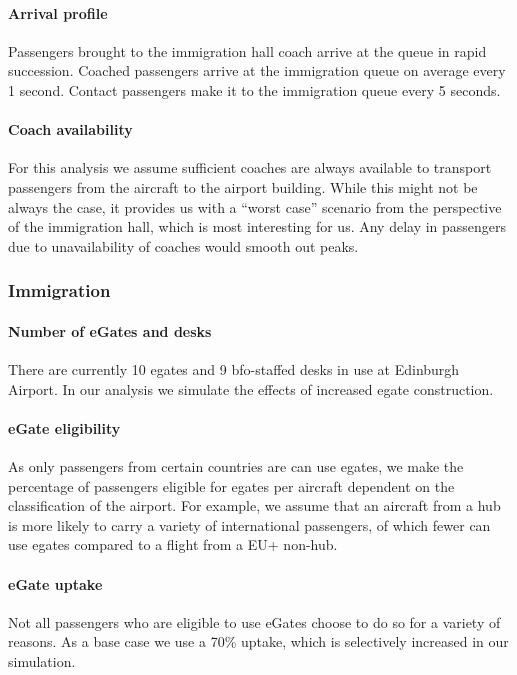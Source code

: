 \documentclass[10pt]{article}
\begin{document}
\paragraph{Arrival profile} 
 Passengers  brought to the immigration hall coach arrive at the queue in rapid succession. Coached passengers arrive at the immigration queue on average every 1 second. Contact passengers make it to the immigration queue every 5 seconds.

\paragraph{Coach availability}
For this analysis we assume sufficient coaches are always available to transport passengers from the aircraft to the airport building. While this might not be always the case, it provides us with a ``worst case'' scenario from the perspective of the immigration hall, which is most interesting for us. Any delay in passengers due to unavailability of coaches would smooth out peaks.

\subsubsection{Immigration} \label{subsec:choices_immigration}

\paragraph{Number of eGates and desks} There are currently 10 \glspl{egate} and 9 \gls{bfo}-staffed desks in use at Edinburgh Airport. In our analysis we simulate the effects of increased \gls{egate} construction.



\paragraph{eGate eligibility} 
As only passengers from certain countries are can use \glspl{egate}, we make the percentage of passengers eligible for \glspl{egate} per aircraft dependent on the classification of the airport. For example, we assume that an aircraft from a hub is more likely to carry a variety of international passengers, of which fewer can use \glspl{egate} compared to a flight from a EU+ non-hub. 

\paragraph{eGate uptake} 
Not all passengers who are eligible to use eGates choose to do so for a variety of reasons. As a base case we use a 70\% uptake, which is selectively increased in our simulation. 
\end{document}
